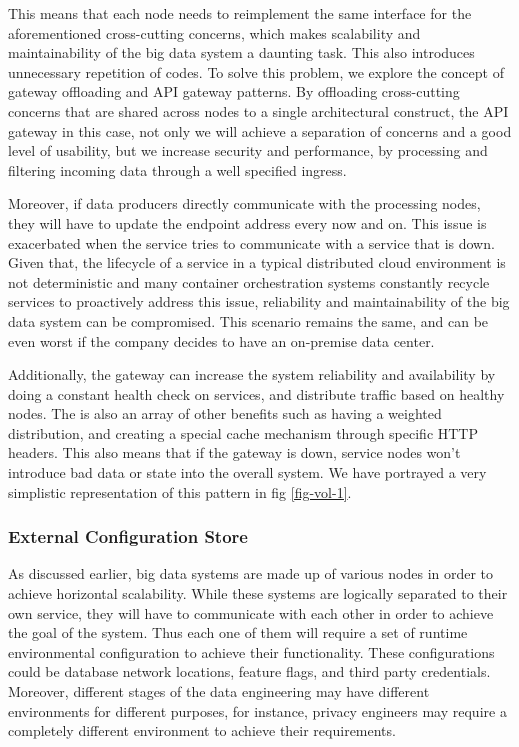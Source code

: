 \documentclass[conference]{IEEEtran}
\begin{document}
This means that each node needs to reimplement the same interface for the aforementioned cross-cutting concerns, which makes scalability and maintainability of the big data system a daunting task. This also introduces unnecessary repetition of codes. To solve this problem, we explore the concept of gateway offloading and API gateway patterns. By offloading cross-cutting concerns that are shared across nodes to a single architectural construct, the API gateway in this case, not only we will achieve a separation of concerns and a good level of usability, but we increase security and performance, by processing and filtering incoming data through a well specified ingress. 

Moreover, if data producers directly communicate with the processing nodes, they will have to update the endpoint address every now and on. This issue is exacerbated when the service tries to communicate with a service that is down. Given that, the lifecycle of a service in a typical distributed cloud environment is not deterministic and many container orchestration systems constantly recycle services to proactively address this issue, reliability and maintainability of the big data system can be compromised. This scenario remains the same, and can be even worst if the company decides to have an on-premise data center. 

Additionally, the gateway can increase the system reliability and availability by doing a constant health check on services, and distribute traffic based on healthy nodes. The is also an array of other benefits such as having a weighted distribution, and creating a special cache mechanism through specific HTTP headers. This also means that if the gateway is down, service nodes won't introduce bad data or state into the overall system. We have portrayed a very simplistic representation of this pattern in fig \ref{fig-vol-1}. 

\subsubsection{External Configuration Store}

As discussed earlier, big data systems are made up of various nodes in order to achieve horizontal scalability. While these systems are logically separated to their own service, they will have to communicate with each other in order to achieve the goal of the system. Thus each one of them will require a set of runtime environmental configuration to achieve their functionality. These configurations could be database network locations, feature flags, and third party credentials. Moreover, different stages of the data engineering may have different environments for different purposes, for instance, privacy engineers may require a completely different environment to achieve their requirements. 
\end{document}
